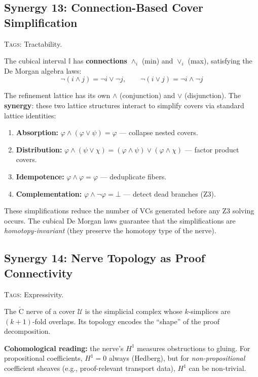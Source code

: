 \documentclass[11pt,a4paper]{article}
\theoremstyle{definition}
\theoremstyle{plain}
\newcommand{\Cech}{\check{\mathrm{C}}}
\newcommand{\covers}{\mathcal{U}}
\newcommand{\Hone}{H^1}
\newcommand{\interval}{\mathbb{I}}
\begin{document}
\subsection{Synergy 13: Connection-Based Cover Simplification}
\label{sec:syn-connections}

\textsc{Tags:} Tractability.

\medskip\noindent
The cubical interval $\interval$ has \textbf{connections}
$\wedge_i$ (min) and $\vee_i$ (max), satisfying the De Morgan
algebra laws:
\[
  \neg(i \wedge j) = \neg i \vee \neg j, \qquad
  \neg(i \vee j) = \neg i \wedge \neg j
\]

The refinement lattice has its own $\wedge$ (conjunction) and
$\vee$ (disjunction).  The \textbf{synergy}: these two lattice
structures interact to simplify covers via standard lattice
identities:

\begin{enumerate}
\item \textbf{Absorption:} $\varphi \wedge (\varphi \vee \psi) = \varphi$
  --- collapse nested covers.
\item \textbf{Distribution:}
  $\varphi \wedge (\psi \vee \chi) = (\varphi \wedge \psi)
  \vee (\varphi \wedge \chi)$ --- factor product covers.
\item \textbf{Idempotence:} $\varphi \wedge \varphi = \varphi$
  --- deduplicate fibers.
\item \textbf{Complementation:} $\varphi \wedge \neg\varphi = \bot$
  --- detect dead branches (Z3).
\end{enumerate}

These simplifications reduce the number of VCs generated before
any Z3 solving occurs.  The cubical De Morgan laws guarantee that
the simplifications are \emph{homotopy-invariant} (they preserve
the homotopy type of the nerve).


\subsection{Synergy 14: Nerve Topology as Proof Connectivity}
\label{sec:syn-nerve}

\textsc{Tags:} Expressivity.

\medskip\noindent
The $\Cech$ nerve of a cover $\covers$ is the simplicial complex
whose $k$-simplices are $(k{+}1)$-fold overlaps.  Its topology
encodes the ``shape'' of the proof decomposition.

\textbf{Cohomological reading:} the nerve's $\Hone$ measures
obstructions to gluing.  For propositional coefficients,
$\Hone = 0$ always (Hedberg), but for \emph{non-propositional}
coefficient sheaves (e.g., proof-relevant transport data),
$\Hone$ can be non-trivial.
\end{document}
